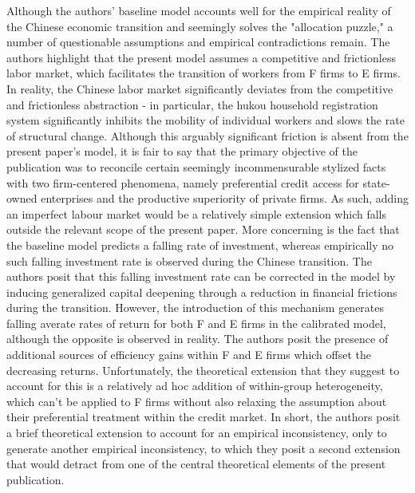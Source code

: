 \documentclass{article}
\begin{document}
Although the authors' baseline model accounts well for the empirical reality of the Chinese economic transition 
and seemingly solves the "allocation puzzle," a number of questionable assumptions and empirical contradictions remain.
The authors highlight that the present model assumes a competitive and frictionless labor market, which facilitates
the transition of workers from F firms to E firms. In reality, the Chinese labor market significantly deviates from the competitive 
and frictionless abstraction - in particular, the hukou household registration system significantly inhibits the mobility
of individual workers and slows the rate of structural change. Although this arguably significant friction is absent from the 
present paper's model, it is fair to say that the primary objective of the publication was to reconcile certain seemingly incommensurable 
stylized facts with two firm-centered phenomena, namely preferential credit access for state-owned enterprises and the 
productive superiority of private firms. As such, adding an imperfect labour market would be a relatively simple extension which falls 
outside the relevant scope of the present paper. More concerning is the fact that the baseline model predicts a falling rate of investment,
whereas empirically no such falling investment rate is observed during the Chinese transition. The authors posit that this falling 
investment rate can be corrected in the model by inducing generalized capital deepening through a reduction in financial frictions during the transition.
However, the introduction of this mechanism generates falling averate rates of return for both F and E firms in the calibrated model, although 
the opposite is observed in reality. The authors posit the presence of additional sources of efficiency gains 
within F and E firms which offset the decreasing returns. Unfortunately, the theoretical extension that 
they suggest to account for this is a relatively ad hoc addition of within-group heterogeneity, which can't be applied to 
F firms without also relaxing the assumption about their preferential treatment within the credit market. In short, 
the authors posit a brief theoretical extension to account for an empirical inconsistency, only to generate another empirical 
inconsistency, to which they posit a second extension that would detract from one of the central theoretical elements 
of the present publication. 
\\
\end{document}
